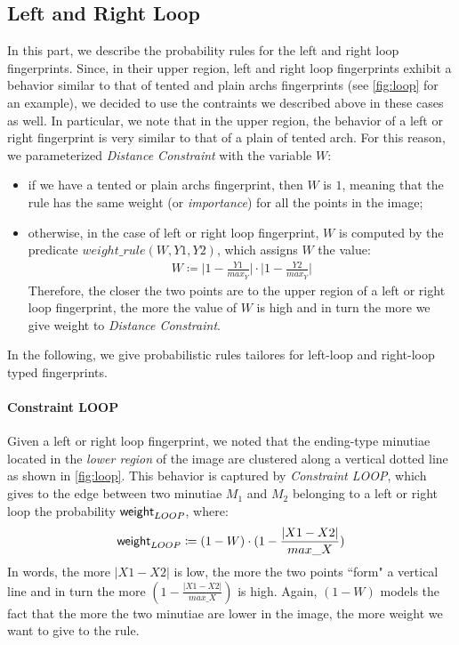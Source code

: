 \documentclass[8pt]{article}
\begin{document}
\subsection{Left and Right Loop}
In this part, we describe the probability rules for the left and right loop
fingerprints.  Since, in their upper region, left and right loop fingerprints
exhibit a behavior similar to that of tented and plain archs fingerprints (see
\cref{fig:loop} for an example), we decided to use the contraints we described
above in these cases as well. In particular, we note that in the upper region,
the behavior of a left or right fingerprint is very similar to that of a plain
of tented arch. For this reason, we parameterized \emph{Distance Constraint}
with the variable $W$:
  \begin{itemize}
    \item
      if we have a tented or plain archs fingerprint, then $W$ is $1$, meaning
      that the rule has the same weight (or \emph{importance}) for all the
      points in the image;
    \item
      otherwise, in the case of left or right loop fingerprint, $W$ is
      computed by the predicate $weight\_rule(W,Y1,Y2)$, which assigns 
      $W$ the value:
        \begin{align*}
          W \coloneqq 
          \Big\lvert 1-\frac{Y1}{max_Y} \Big\rvert 
          \cdot 
          \Big\lvert 1-\frac{Y2}{max_Y} \Big\rvert
        \end{align*}
      Therefore, the closer the two points are to the upper region of a left or
      right loop fingerprint, the more the value of $W$ is high and in turn the
      more we give weight to \emph{Distance Constraint}.
  \end{itemize}


In the following, we give probabilistic rules tailores for left-loop and
right-loop typed fingerprints.
\paragraph{Constraint LOOP}
Given a left or right loop fingerprint, we noted that the ending-type
minutiae located in the \emph{lower region} of the image are clustered along
a vertical dotted line as shown in \cref{fig:loop}.
This behavior is captured by \emph{Constraint LOOP}, which gives to
the edge between two minutiae $M_1$ and $M_2$ belonging to a left or right loop
the probability $\textsf{weight}_{LOOP}$, where:
  \begin{align*}
    \textsf{weight}_{LOOP} \coloneqq
    (1-W)\cdot 
    (1-\frac{\lvert X1-X2 \rvert}{max\_X})
  \end{align*}
In words, the more $\lvert X1-X2 \rvert$ is low, the more the two points
``form" a vertical line and in turn the more $(1-\frac{\lvert X1-X2
\rvert}{max\_X})$ is high.  Again, $(1-W)$ models the fact that the more the
two minutiae are lower in the image, the more weight we want to give to the
rule.  
\end{document}
